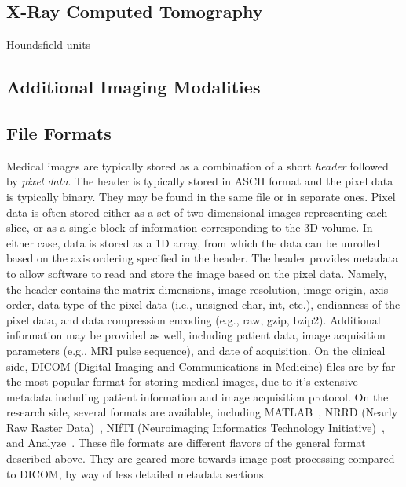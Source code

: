 \subsection{X-Ray Computed Tomography}
\label{X-Ray Computed Tomography}

Houndsfield units

\subsection{Additional Imaging Modalities}
\label{Other Imaging Modalities}

\subsection{File Formats}
\label{Data Format-IMG}

Medical images are typically stored as a combination of a short \textit{header} followed by \textit{pixel data}. The header is typically stored in ASCII format and the pixel data is typically binary. They may be found in the same file or in separate ones. Pixel data is often stored either as a set of two-dimensional images representing each slice, or as a single block of information corresponding to the 3D volume. In either case, data is stored as a 1D array, from which the data can be unrolled based on the axis ordering specified in the header. The header provides metadata to allow software to read and store the image based on the pixel data. Namely, the header contains the matrix dimensions, image resolution, image origin, axis order, data type of the pixel data (i.e., unsigned char, int, etc.), endianness of the pixel data, and data compression encoding (e.g., raw, gzip, bzip2). Additional information may be provided as well, including patient data, image acquisition parameters (e.g., MRI pulse sequence), and date of acquisition. On the clinical side, DICOM (Digital Imaging and Communications in Medicine) files are by far the most popular format for storing medical images, due to it's extensive metadata including patient information and image acquisition protocol. On the research side, several formats are available, including MATLAB~\cite{MATLAB}, NRRD (Nearly Raw Raster Data)~\cite{nrrd}, NIfTI (Neuroimaging Informatics Technology Initiative)~\cite{nifti}, and Analyze~\cite{analyzedirect}. These file formats are different flavors of the general format described above. They are geared more towards image post-processing compared to DICOM, by way of less detailed metadata sections.


